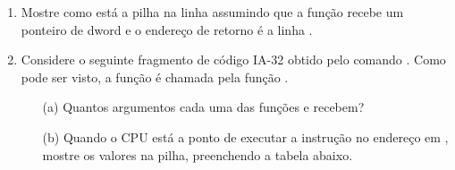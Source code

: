 \begin{enumerate}
    \item
    Mostre como está a pilha na linha  assumindo que a função recebe
    um ponteiro de dword e o endereço de retorno é a linha .

    \item
    Considere o seguinte fragmento de código IA-32 obtido pelo comando .
    Como pode ser visto, a função  é chamada pela função .

    \begin{itemize}
        \item [(a)]
        Quantos argumentos cada uma das funções  e  recebem?
        
        \item [(b)] 
        Quando o CPU está a ponto de executar a instrução
         no endereço  em , 
        mostre os valores na pilha, preenchendo a tabela abaixo.

        \begin{figure}[H]\centering
        \end{figure}
    \end{itemize}

\end{enumerate}
